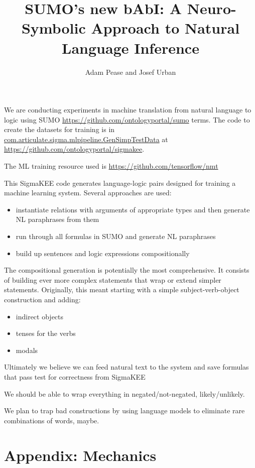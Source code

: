 \documentclass[letterpaper]{article}
\title{SUMO's new bAbI: A Neuro-Symbolic Approach to Natural Language Inference}
\date{\vspace{-5ex}}
\author{Adam Pease and Josef Urban}
\begin{document}
\maketitle

We are conducting experiments in machine translation from natural language to logic using SUMO \url{https://github.com/ontologyportal/sumo} terms.
The code to create the datasets for training is in \url{com.articulate.sigma.mlpipeline.GenSimpTestData} at 
\url{https://github.com/ontologyportal/sigmakee}.

The ML training resource used is \url{https://github.com/tensorflow/nmt}

This SigmaKEE code generates language-logic pairs designed for training a machine learning system. Several approaches are used:

\begin{itemize}
\item instantiate relations with arguments of appropriate types and then generate NL paraphrases from them
\item run through all formulas in SUMO and generate NL paraphrases
\item build up sentences and logic expressions compositionally
\end{itemize}


The compositional generation is potentially the most comprehensive. It consists of building ever more complex statements that wrap or extend simpler statements. Originally, this meant starting with a simple subject-verb-object construction and adding:

\begin{itemize}
\item indirect objects
\item tenses for the verbs
\item modals
\end{itemize}

Ultimately we believe we can feed natural text to the system and save formulas that pass test for correctness from SigmaKEE

We should be able to wrap everything in negated/not-negated, likely/unlikely.

We plan to trap bad constructions by using language models to eliminate rare combinations of words, maybe.

\section{Appendix: Mechanics}
\end{document}
